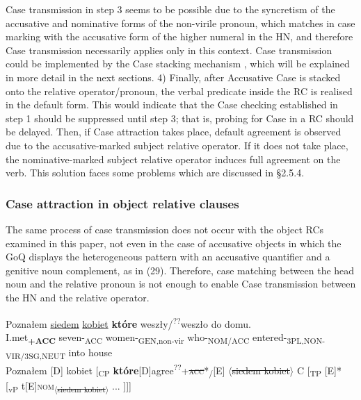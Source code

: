 \documentclass[output=paper]{langsci/langscibook}
\begin{document}
Case transmission in step 3 seems to be possible due to the syncretism of the accusative and nominative forms of the non-virile pronoun, which matches in case marking with the accusative form of the higher numeral in the HN, and therefore Case transmission necessarily applies only in this context. Case transmission could be implemented by the Case stacking mechanism \citep{Vogel2001}, which will be explained in more detail in the next sections. 4) Finally, after Accusative Case is stacked onto the relative operator/pronoun, the verbal predicate inside the RC is realised in the default form. This would indicate that the Case checking established in step 1 should be suppressed until step 3; that is, probing for Case in a RC should be delayed. Then, if Case attraction takes place, default agreement is observed due to the accusative-marked subject relative operator. If it does not take place, the nominative-marked subject relative operator induces full agreement on the verb. This solution faces some problems which are discussed in §2.5.4.

\subsubsection{Case attraction in object relative clauses}%

The same process of case transmission does not occur with the object RCs examined in this paper, not even in the case of accusative objects in which the GoQ displays the heterogeneous pattern with an accusative quantifier and a genitive noun complement, as in (29). Therefore, case matching between the head noun and the relative pronoun is not enough to enable Case transmission between the HN and the relative operator.

\ea\label{ex:leska:29}
\gll Poznałem \ul{siedem}     \ul{kobiet}     \textbf{które} weszły/\textsuperscript{??}weszło   do   domu.\\
     I.met\textbf{\textsubscript{+ACC}} seven-\textsubscript{ACC}   women-\textsubscript{GEN,non-vir}  who-\textsubscript{NOM/ACC}    entered-\textsubscript{3PL,NON-VIR/3SG,NEUT}  into house\\
\glt Poznałem [D] kobiet [\textsubscript{CP} \textbf{które}[D]{agree\textsuperscript{??}+\textsc{\st{acc}}}*\textsubscript{\slash}[E] $\langle$\st{siedem kobiet}$\rangle$ C [\textsubscript{TP} [E]* [\textsubscript{vP} t[E]{\footnotesize\textsc{nom}}\textsubscript{$\langle$\st{siedem kobiet}$\rangle$} ... ]]]
\z
\end{document}
